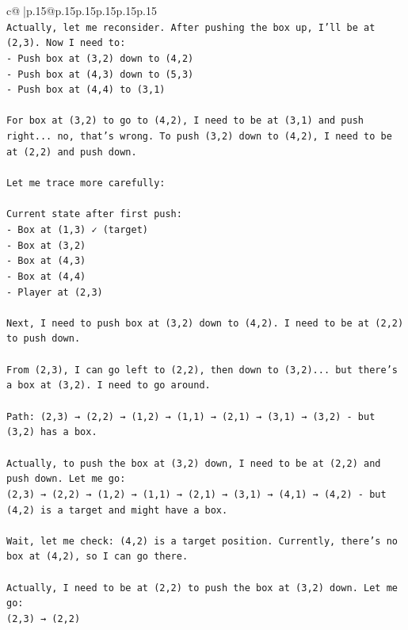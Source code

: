 \documentclass{article}
\begin{document}
{\begin{supertabular}{c@{$\;$}|p{.15\linewidth}@{}p{.15\linewidth}p{.15\linewidth}p{.15\linewidth}p{.15\linewidth}p{.15\linewidth}}
{{{\\ 
\texttt{Actually, let me reconsider. After pushing the box up, I'll be at (2,3). Now I need to:} \\
\texttt{{-} Push box at (3,2) down to (4,2)} \\
\texttt{{-} Push box at (4,3) down to (5,3)} \\
\texttt{{-} Push box at (4,4) to (3,1)} \\
\\ 
\texttt{For box at (3,2) to go to (4,2), I need to be at (3,1) and push right... no, that's wrong. To push (3,2) down to (4,2), I need to be at (2,2) and push down.} \\
\\ 
\texttt{Let me trace more carefully:} \\
\\ 
\texttt{Current state after first push:} \\
\texttt{{-} Box at (1,3) ✓ (target)} \\
\texttt{{-} Box at (3,2)} \\
\texttt{{-} Box at (4,3)} \\
\texttt{{-} Box at (4,4)} \\
\texttt{{-} Player at (2,3)} \\
\\ 
\texttt{Next, I need to push box at (3,2) down to (4,2). I need to be at (2,2) to push down.} \\
\\ 
\texttt{From (2,3), I can go left to (2,2), then down to (3,2)... but there's a box at (3,2). I need to go around.} \\
\\ 
\texttt{Path: (2,3) → (2,2) → (1,2) → (1,1) → (2,1) → (3,1) → (3,2) {-} but (3,2) has a box.} \\
\\ 
\texttt{Actually, to push the box at (3,2) down, I need to be at (2,2) and push down. Let me go:} \\
\texttt{(2,3) → (2,2) → (1,2) → (1,1) → (2,1) → (3,1) → (4,1) → (4,2) {-} but (4,2) is a target and might have a box.} \\
\\ 
\texttt{Wait, let me check: (4,2) is a target position. Currently, there's no box at (4,2), so I can go there.} \\
\\ 
\texttt{Actually, I need to be at (2,2) to push the box at (3,2) down. Let me go:} \\
\texttt{(2,3) → (2,2)} \\
}}}
\end{supertabular}}
\end{document}
